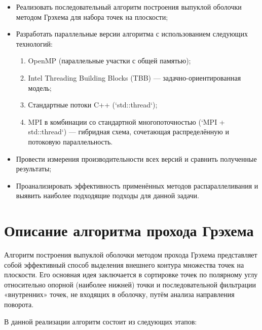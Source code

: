 \documentclass[12pt,a4paper]{extarticle}
\begin{document}
\begin{itemize}
    \item Реализовать последовательный алгоритм построения выпуклой оболочки методом Грэхема для набора точек на плоскости;
    \item Разработать параллельные версии алгоритма с использованием следующих технологий:
    \begin{enumerate}
        \item OpenMP (параллельные участки с общей памятью);
        \item Intel Threading Building Blocks (TBB) — задачно-ориентированная модель;
        \item Стандартные потоки C++ (`std::thread`);
        \item MPI в комбинации со стандартной многопоточностью (`MPI + std::thread`) — гибридная схема, сочетающая распределённую и потоковую параллельность.
    \end{enumerate}
    \item Провести измерения производительности всех версий и сравнить полученные результаты;
    \item Проанализировать эффективность применённых методов распараллеливания и выявить наиболее подходящие подходы для данной задачи.
\end{itemize}

\section{Описание алгоритма прохода Грэхема}

Алгоритм построения выпуклой оболочки методом прохода Грэхема представляет собой эффективный способ выделения внешнего контура множества точек на плоскости. Его основная идея заключается в сортировке точек по полярному углу относительно опорной (наиболее нижней) точки и последовательной фильтрации «внутренних» точек, не входящих в оболочку, путём анализа направления поворота.

В данной реализации алгоритм состоит из следующих этапов:
\end{document}
